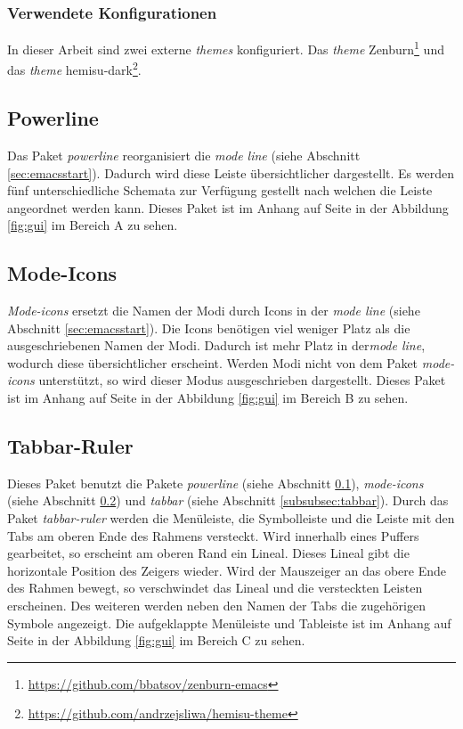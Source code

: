 \subsubsection{Verwendete Konfigurationen}
In dieser Arbeit sind zwei externe \textit{themes} konfiguriert. Das
\textit{theme}
       {\glqq}Zenburn\footnote{\url{https://github.com/bbatsov/zenburn-emacs}}{\grqq}
       und das \textit{theme}
       {\glqq}hemisu-dark\footnote{\url{https://github.com/andrzejsliwa/hemisu-theme}}{\grqq}.\\

\subsection{Powerline}
\label{subsec:powerline}
Das Paket \textit{powerline} reorganisiert die \textit{mode line}
(siehe Abschnitt \ref{sec:emacsstart}). Dadurch wird diese Leiste
übersichtlicher dargestellt. Es werden fünf unterschiedliche Schemata
zur Verfügung gestellt nach welchen die Leiste angeordnet werden
kann. Dieses Paket ist im Anhang auf Seite \pageref{fig:gui} in der
Abbildung \ref{fig:gui} im Bereich {\glqq}A{\grqq} zu
sehen. \cite{Powerline}\\

\subsection{Mode-Icons}
\label{subsec:modeicons}
\textit{Mode-icons} ersetzt die Namen der Modi durch Icons in der
\textit{mode line} (siehe Abschnitt \ref{sec:emacsstart}). Die Icons
benötigen viel weniger Platz als die ausgeschriebenen Namen der
Modi. Dadurch ist mehr Platz in der\textit{mode line}, wodurch diese
übersichtlicher erscheint. Werden Modi nicht von dem Paket
\textit{mode-icons} unterstützt, so wird dieser Modus ausgeschrieben
dargestellt. Dieses Paket ist im Anhang auf Seite \pageref{fig:gui} in
der Abbildung \ref{fig:gui} im Bereich {\glqq}B{\grqq} zu
sehen. \cite{ModeIcons}\\

\subsection{Tabbar-Ruler}
\label{subsec:tabbarruler}
Dieses Paket benutzt die Pakete \textit{powerline} (siehe Abschnitt
\ref{subsec:powerline}), \textit{mode-icons} (siehe Abschnitt
\ref{subsec:modeicons}) und \textit{tabbar} (siehe Abschnitt
\ref{subsubsec:tabbar}). Durch das Paket \textit{tabbar-ruler} werden
die Menüleiste, die Symbolleiste und die Leiste mit den Tabs am oberen
Ende des Rahmens versteckt. Wird innerhalb eines Puffers gearbeitet,
so erscheint am oberen Rand ein {\glqq}Lineal{\grqq}. Dieses Lineal
gibt die horizontale Position des Zeigers wieder. Wird der Mauszeiger
an das obere Ende des Rahmen bewegt, so verschwindet das
{\glqq}Lineal{\glqq} und die versteckten Leisten erscheinen. Des
weiteren werden neben den Namen der Tabs die zugehörigen Symbole
angezeigt. Die aufgeklappte Menüleiste und Tableiste ist im Anhang auf
Seite \pageref{fig:gui} in der Abbildung \ref{fig:gui} im Bereich
{\glqq}C{\grqq} zu sehen. \cite{TabbarRuler}\\

